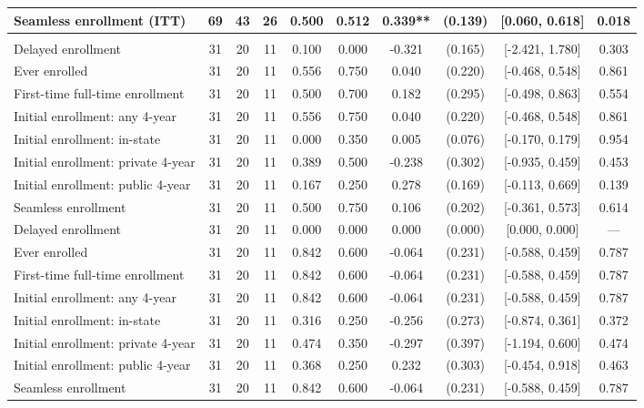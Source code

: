 \begin{table}[t]
\begin{tabular*}{\linewidth}{@{\extracolsep{\fill}}l|ccccccccc}
Seamless enrollment (ITT) & 69 & 43 & 26 & 0.500 & 0.512 & 0.339** & (0.139) & [0.060, 0.618] & 0.018 \\ 
\midrule\addlinespace[2.5pt]
\multicolumn{10}{l}{{\itshape \textbf{Panel B: Enrollment Outcomes} \emph{(NSC-matched students only)}}} \\[2.5pt] 
\midrule\addlinespace[2.5pt]
Delayed enrollment & 31 & 20 & 11 & 0.100 & 0.000 & -0.321 & (0.165) & [-2.421, 1.780] & 0.303 \\ 
Ever enrolled & 31 & 20 & 11 & 0.556 & 0.750 & 0.040 & (0.220) & [-0.468, 0.548] & 0.861 \\ 
First-time full-time enrollment & 31 & 20 & 11 & 0.500 & 0.700 & 0.182 & (0.295) & [-0.498, 0.863] & 0.554 \\ 
Initial enrollment: any 4-year & 31 & 20 & 11 & 0.556 & 0.750 & 0.040 & (0.220) & [-0.468, 0.548] & 0.861 \\ 
Initial enrollment: in-state & 31 & 20 & 11 & 0.000 & 0.350 & 0.005 & (0.076) & [-0.170, 0.179] & 0.954 \\ 
Initial enrollment: private 4-year & 31 & 20 & 11 & 0.389 & 0.500 & -0.238 & (0.302) & [-0.935, 0.459] & 0.453 \\ 
Initial enrollment: public 4-year & 31 & 20 & 11 & 0.167 & 0.250 & 0.278 & (0.169) & [-0.113, 0.669] & 0.139 \\ 
Seamless enrollment & 31 & 20 & 11 & 0.500 & 0.750 & 0.106 & (0.202) & [-0.361, 0.573] & 0.614 \\ 
Delayed enrollment & 31 & 20 & 11 & 0.000 & 0.000 & 0.000 & (0.000) & [0.000, 0.000] & — \\ 
Ever enrolled & 31 & 20 & 11 & 0.842 & 0.600 & -0.064 & (0.231) & [-0.588, 0.459] & 0.787 \\ 
First-time full-time enrollment & 31 & 20 & 11 & 0.842 & 0.600 & -0.064 & (0.231) & [-0.588, 0.459] & 0.787 \\ 
Initial enrollment: any 4-year & 31 & 20 & 11 & 0.842 & 0.600 & -0.064 & (0.231) & [-0.588, 0.459] & 0.787 \\ 
Initial enrollment: in-state & 31 & 20 & 11 & 0.316 & 0.250 & -0.256 & (0.273) & [-0.874, 0.361] & 0.372 \\ 
Initial enrollment: private 4-year & 31 & 20 & 11 & 0.474 & 0.350 & -0.297 & (0.397) & [-1.194, 0.600] & 0.474 \\ 
Initial enrollment: public 4-year & 31 & 20 & 11 & 0.368 & 0.250 & 0.232 & (0.303) & [-0.454, 0.918] & 0.463 \\ 
Seamless enrollment & 31 & 20 & 11 & 0.842 & 0.600 & -0.064 & (0.231) & [-0.588, 0.459] & 0.787 \\ 

\end{tabular*}
\end{table}
